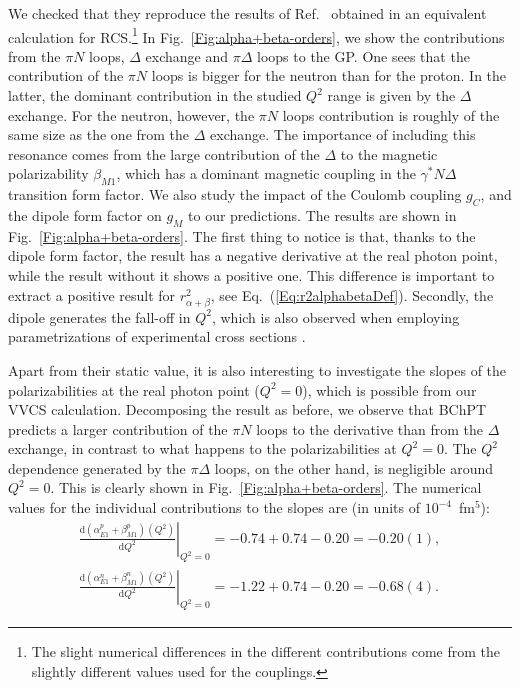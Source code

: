 \documentclass[twocolumn,prc,showpacs,nofootinbib,preprintnumbers,amsmath,amssymb,superscriptaddress]{revtex4-1}
\def\dd{\mathrm{d}}
\begin{document}
We checked that they reproduce the results of Ref.~\cite{Lensky:2009uv} obtained in an equivalent calculation for RCS.\footnote{The slight numerical differences in the different contributions come from the slightly different values used for the couplings.} 
In Fig.~\ref{Fig:alpha+beta-orders}, we show the contributions from the $\pi N$ loops, $\Delta$ exchange and $\pi \Delta$ loops to the GP.
One sees that the contribution of the $\pi N$ loops is bigger for the neutron than for the proton. 
In the latter, the dominant contribution in the studied $Q^2$ range is given by the $\Delta$ exchange. 
For the neutron, however, the $\pi N$ loops contribution is roughly of the same size as the one from the $\Delta$ exchange.
The importance of including this resonance comes from the large contribution of the $\Delta$ to the magnetic polarizability $\beta_{M1}$, which has a dominant magnetic coupling in the $\gamma^* N \Delta$ transition form factor. 
We also study the impact of the Coulomb coupling $g_C$, and the dipole form factor on $g_M$ to our predictions.
The results are shown in Fig.~\ref{Fig:alpha+beta-orders}. 
The first thing to notice is that, thanks to the dipole form factor, the result has a negative derivative at the real photon point, while the result without it shows a positive one. 
This difference is important to extract a positive result for $r_{\alpha+\beta}^2$, see Eq.~(\ref{Eq:r2alphabetaDef}).
Secondly, the dipole generates the fall-off in $Q^2$, which is also observed when employing parametrizations of experimental cross sections \cite{Hall:2014lea}.

Apart from their static value, it is also interesting to investigate the slopes of the polarizabilities at the real photon point ($Q^2=0$), which is possible from our VVCS calculation. 
Decomposing the result as before, we observe that BChPT predicts a larger contribution of the $\pi N$ loops to the derivative than from the $\Delta$ exchange, in contrast to what happens to the polarizabilities at $Q^2 = 0$. The $Q^2$ dependence generated by the $\pi \Delta$ loops, on the other hand, is negligible around $Q^2=0$. 
This is clearly shown in Fig.~\ref{Fig:alpha+beta-orders}. The numerical values for the individual contributions to the slopes are (in units of   $10^{-4}$~fm$^5$):
\begin{align}
\left.\frac{\dd(\alpha_{E1}^p + \beta_{M1}^p) (Q^2)}{\dd Q^2}\right|_{Q^2=0}= -0.74  + 0.74-0.20 = -0.20(1),\\
\left.\frac{\dd(\alpha_{E1}^n + \beta_{M1}^n) (Q^2)}{\dd Q^2}\right|_{Q^2=0}= -1.22  +0.74-0.20 =-0.68(4).
\end{align}
\end{document}
